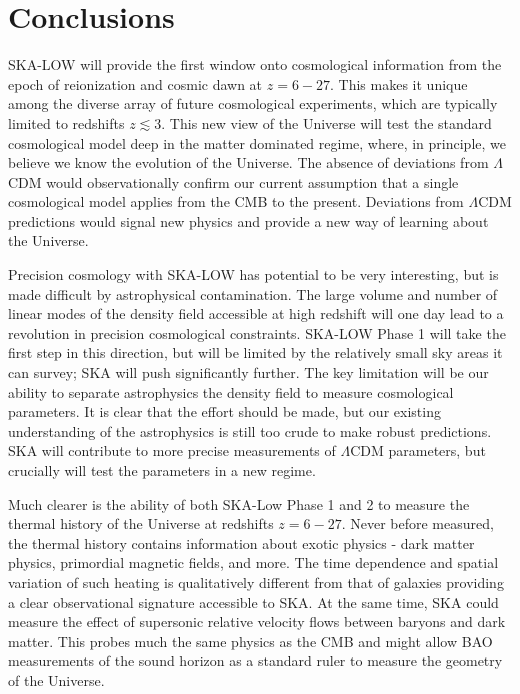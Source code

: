 \documentclass{PoS}
\begin{document}
\section{Conclusions}

SKA-LOW will provide the first window onto cosmological information from the epoch of reionization and cosmic dawn at $z=6-27$. This makes it unique among the diverse array of future cosmological experiments, which are typically limited to redshifts $z\lesssim3$. This new view of the Universe will test the standard cosmological model deep in the matter dominated regime, where, in principle, we believe we know the evolution of the Universe. The absence of deviations from $\Lambda$CDM would observationally confirm our current assumption that a single cosmological model applies from the CMB to the present. Deviations from $\Lambda$CDM predictions would signal new physics and provide a new way of learning about the Universe.

Precision cosmology with SKA-LOW has potential to be very interesting, but is made difficult by astrophysical contamination. The large volume and number of linear modes of the density field accessible at high redshift will one day lead to a revolution in precision cosmological constraints. SKA-LOW Phase 1 will take the first step in this direction, but will be limited by the relatively small sky areas it can survey; SKA will push significantly further. The key limitation will be our ability to separate astrophysics the density field to measure cosmological parameters. It is clear that the effort should be made, but our existing understanding of the astrophysics is still too crude to make robust predictions. SKA will contribute to more precise measurements of $\Lambda$CDM parameters, but crucially will test the parameters in a new regime.

Much clearer is the ability of both SKA-Low Phase 1 and 2 to measure the thermal history of the Universe at redshifts $z=6-27$. Never before measured, the thermal history contains information about exotic physics - dark matter physics, primordial magnetic fields, and more. The time dependence and spatial variation of such heating is qualitatively different from that of galaxies providing a clear observational signature accessible to SKA. At the same time, SKA could measure the effect of supersonic relative velocity flows between baryons and dark matter. This probes much the same physics as the CMB and might allow BAO measurements of the sound horizon as a standard ruler to measure the geometry of the Universe.
\end{document}
